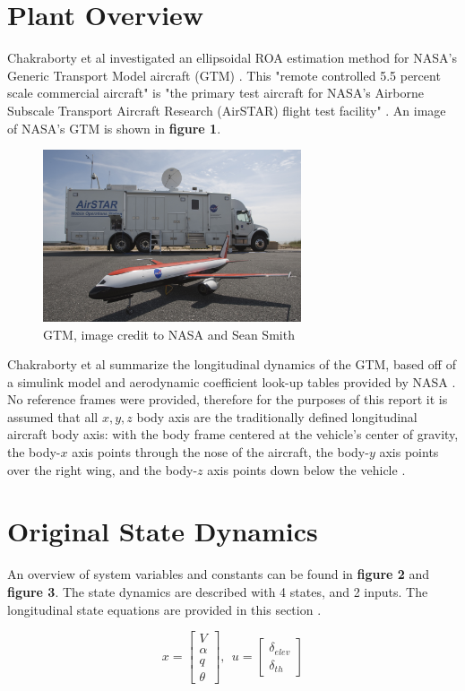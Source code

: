 \documentclass[%
 reprint,
 amsmath,amssymb,
 aps,
]{revtex4-2}
\begin{document}
\section{Plant Overview}
Chakraborty et al investigated an ellipsoidal ROA estimation method for NASA's Generic Transport Model aircraft (GTM) \cite{primary}. This "remote controlled 5.5 percent scale commercial aircraft" is "the primary test aircraft for NASA's Airborne Subscale Transport Aircraft Research (AirSTAR) flight test facility" \cite{primary}. An image of NASA's GTM is shown in \textbf{figure 1}. 

\begin{figure}
    \centering
    \includegraphics[width=3in]{airstar_0.jpg}
    \caption{GTM, image credit to NASA and Sean Smith \cite{airstar}}
    \label{fig:gtm}
\end{figure}

Chakraborty et al summarize the longitudinal dynamics of the GTM, based off of a simulink model and aerodynamic coefficient look-up tables provided by NASA \cite{primary}. No reference frames were provided, therefore for the purposes of this report it is assumed that all $x,y,z$ body axis are the traditionally defined longitudinal aircraft body axis: with the body frame centered at the vehicle's center of gravity, the body-$x$ axis points through the nose of the aircraft, the body-$y$ axis points over the right wing, and the body-$z$ axis points down below the vehicle \cite{body}.

\section{Original State Dynamics} 

An overview of system variables and constants can be found in \textbf{figure 2} and \textbf{figure 3}. The state dynamics are described with 4 states, and 2 inputs. The longitudinal state equations are provided in this section \cite{primary}.

$$ x = \begin{bmatrix} V \\ \alpha \\ q \\ \theta \end{bmatrix},\ \ u = \begin{bmatrix} \delta_{elev} \\ \delta_{th} \end{bmatrix} $$ 
\end{document}
